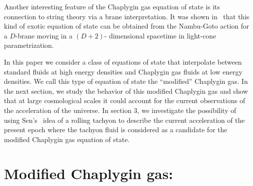 \documentclass[a4paper,12pt,a4]{article}
\begin{document}
Another interesting feature of the Chaplygin gas equation of state 
is its connection to string theory via a brane interpretation.  
It was shown in~\cite{nao} that this kind of exotic equation of state can 
be obtained from the Nambu-Goto action for a $D$-brane moving in a $(D+2)$-
dimensional spacetime in light-cone parametrization. 
 
In this paper we consider a class of equations of state  
that interpolate between standard fluids at high energy densities
and Chaplygin gas fluids at low energy densities. We call 
this type of equation of state the ``modified'' Chaplygin gas. In the 
next section, we study the behavior of this modified Chaplygin gas and show 
that at large cosmological scales it could account for the current 
observations of the acceleration of the universe. In section 3, we 
investigate the possibility of using Sen's~\cite{sen1, sen2,sen3} idea of 
a rolling tachyon to describe the current acceleration of the present 
epoch where the tachyon fluid is considered as a candidate for 
the modified Chaplygin gas equation of state. 

\section{Modified Chaplygin gas:}
\end{document}
